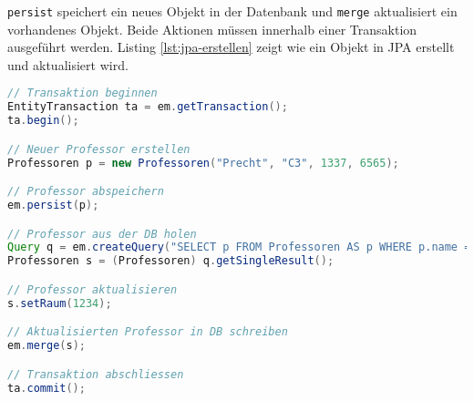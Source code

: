 \texttt{persist} speichert ein neues Objekt in der Datenbank und \texttt{merge} aktualisiert ein vorhandenes Objekt. Beide Aktionen müssen innerhalb einer Transaktion ausgeführt werden. Listing \ref{lst:jpa-erstellen} zeigt wie ein Objekt in JPA erstellt und aktualisiert wird.

\begin{lstlisting}[language=Java,keywordstyle=\color{keywordcolor},caption={Daten updaten mit JPA},label=lst:jpa-erstellen]
// Transaktion beginnen
EntityTransaction ta = em.getTransaction();
ta.begin();

// Neuer Professor erstellen
Professoren p = new Professoren("Precht", "C3", 1337, 6565);

// Professor abspeichern
em.persist(p);

// Professor aus der DB holen
Query q = em.createQuery("SELECT p FROM Professoren AS p WHERE p.name = 'Precht'", Professoren.class);
Professoren s = (Professoren) q.getSingleResult();

// Professor aktualisieren
s.setRaum(1234);

// Aktualisierten Professor in DB schreiben
em.merge(s);

// Transaktion abschliessen
ta.commit();
\end{lstlisting}